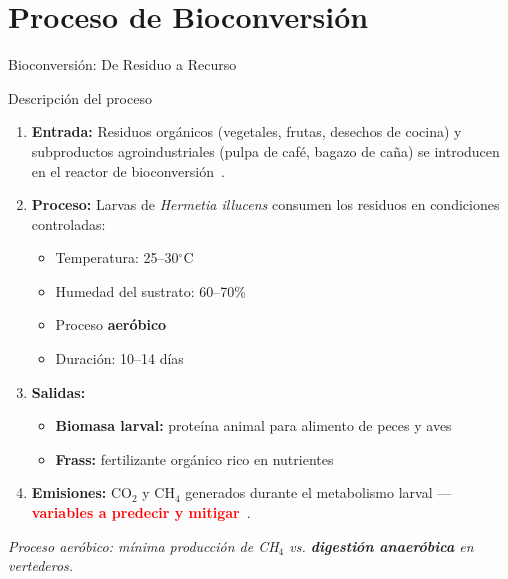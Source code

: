 \documentclass[aspectratio=169, 11pt]{beamer}
\newcommand{\BSF}{\textit{Hermetia illucens}}
\begin{document}
\section{Proceso de Bioconversión}
\begin{frame}{Bioconversi\'on: De Residuo a Recurso}

\begin{block}{Descripci\'on del proceso}
\footnotesize
\begin{enumerate}
    \item \textbf{Entrada:} Residuos org\'anicos (vegetales, frutas, desechos de cocina) 
    y subproductos agroindustriales (pulpa de caf\'e, bagazo de ca\~na) se introducen 
    en el reactor de bioconversi\'on~\cite{singhInclusiveApproachOrganic2019a,bermudez-serranoComprehensiveUtilizationBlack2023}.
    
    \item \textbf{Proceso:} Larvas de \BSF{} consumen los residuos en condiciones controladas:
    \begin{itemize}
        \item Temperatura: 25--30$^\circ$C~\cite{salamEffectDifferentEnvironmental2022}
        \item Humedad del sustrato: 60--70\%~\cite{bekkerImpactSubstrateMoisture2021a}
        \item Proceso \textbf{aer\'obico}~\cite{dienerConversionOrganicMaterial2011}
        \item Duraci\'on: 10--14 d\'ias~\cite{dienerConversionOrganicMaterial2011,surendraBioconversionOrganicWastes2016}
    \end{itemize}
    
    \item \textbf{Salidas:}
    \begin{itemize}
        \item \textbf{Biomasa larval:} prote\'ina animal para alimento de peces y 
        aves~\cite{bermudez-serranoComprehensiveUtilizationBlack2023}
        \item \textbf{Frass:} fertilizante org\'anico rico en 
        nutrientes~\cite{bermudez-serranoComprehensiveUtilizationBlack2023}
    \end{itemize}
    
    \item \textbf{Emisiones:} CO$_2$ y CH$_4$ generados durante el metabolismo larval --- 
    \textcolor{red}{\textbf{variables a predecir y mitigar}}~\cite{rossiEstimatingDynamicsGreenhouse2024a,fuhrmannComprehensiveIndustryrelevantBlack2025a}.
\end{enumerate}
\end{block}

\vspace{0.3cm}
\centering
\textit{\footnotesize Proceso aer\'obico: m\'inima producci\'on de CH$_4$ vs. \textbf{digesti\'on anaer\'obica} en vertederos.}

\end{frame}
\end{document}

